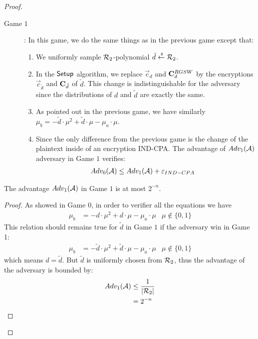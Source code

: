 \begin{proof}
\begin{description}
\begin{description}
    \item[\textsf{Game} $1$]: In this game, we do the same things as in the previous game except that:
      \begin{enumerate}
      \item We uniformly sample ${\mathcal{R}}_2$-polynomial $\tilde{d} \stackrel{{\scriptscriptstyle \mkern4mu \$}}{\gets} {\mathcal{R}}_2$.
      \item In the ${\mathsf{Setup}}$ algorithm, we replace $\vec{c}_d$ and $\mathbf{C}_d^{RGSW}$ by the encryptions $\vec{c}_{\tilde{d}}$ and $\mathbf{C}_{\tilde{d}}$ of $\tilde{d}$.
        This change is indistinguishable for the adversary since the distributions of $d$ and $\tilde{d}$ are exactly the same.
      \item As pointed out in the previous game, we have similarly $\mu_b = - \tilde{d} \cdot \mu^2 + \tilde{d} \cdot \mu - \mu_a \cdot \mu$.
      \item Since the only difference from the previous game is the change of the plaintext inside of an encryption IND-CPA.
        The advantage of $Adv_1(\mathcal{A})$ adversary in \textsf{Game} $1$ verifies:
        \begin{align*}
          Adv_0(\mathcal{A}) &\leq Adv_1(\mathcal{A}) + \varepsilon_{IND-CPA}
        \end{align*}
      \end{enumerate}
    \end{description}

    \begin{lemma}
      The advantage $Adv_1(\mathcal{A})$ in \textsf{Game} $1$ is at most $2^{-n}$.
    \end{lemma}
    \begin{proof}
      As showed in \textsf{Game} $0$, in order to verifier all the equations we have
      \begin{align*}
        \mu_b &= - d \cdot \mu^2 + d \cdot \mu - \mu_a \cdot \mu & \mu \not \in \{0,1\}
      \end{align*}
      This relation should remains true for $\tilde{d}$ in \textsf{Game} $1$ if the adversary win in \textsf{Game} 1:
      \begin{align*}
        \mu_b &= - \tilde{d} \cdot \mu^2 + \tilde{d} \cdot \mu - \mu_a \cdot \mu &\mu \not \in \{0,1\}
      \end{align*}
      which means $d = \tilde{d}$.
      But $\tilde{d}$ is uniformly chosen from ${\mathcal{R}}_2$, thus the advantage of the adversary is bounded by:
      \begin{align*}
        Adv_1(\mathcal{A}) &\leq \frac{1}{|{\mathcal{R}}_2|}\\
        &= 2^{-n}
      \end{align*}
      
    \end{proof}

    
  \end{description}

\end{proof}

